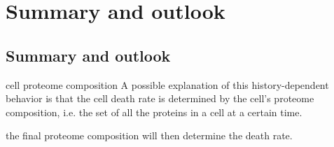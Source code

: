 \chapter{Summary and outlook}
\section{Summary and outlook}
cell proteome composition
A possible explanation of this history-dependent behavior is that the cell death rate is determined by the cell’s proteome composition, i.e. the set of all the proteins in a cell at a certain time.

the final proteome composition will then determine the death rate.